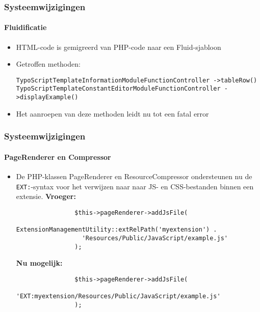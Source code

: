 \begin{frame}[fragile]
	\frametitle{Systeemwijzigingen}
	\framesubtitle{Fluidificatie}

	\begin{itemize}
		\item HTML-code is gemigreerd van PHP-code naar een Fluid-sjabloon
		\item Getroffen methoden:\newline

			\smaller\texttt{TypoScriptTemplateInformationModuleFunctionController\newline
				->tableRow()}\normalsize\newline
			\smaller\texttt{TypoScriptTemplateConstantEditorModuleFunctionController\newline
				->displayExample()}\normalsize

		\item Het aanroepen van deze methoden leidt nu tot een fatal error

	\end{itemize}

\end{frame}


\begin{frame}[fragile]
	\frametitle{Systeemwijzigingen}
	\framesubtitle{PageRenderer en Compressor}

	\lstset{basicstyle=\smaller\ttfamily}

	\begin{itemize}

		\item De PHP-klassen PageRenderer en ResourceCompressor ondersteunen nu de \texttt{EXT:}-syntax 
			voor het verwijzen naar naar JS- en CSS-bestanden binnen een extensie.\newline
			\textbf{Vroeger:}

			\begin{lstlisting}
				$this->pageRenderer->addJsFile(
				  ExtensionManagementUtility::extRelPath('myextension') .
				  'Resources/Public/JavaScript/example.js'
				);
			\end{lstlisting}

			\textbf{Nu mogelijk:}

			\begin{lstlisting}
				$this->pageRenderer->addJsFile(
				  'EXT:myextension/Resources/Public/JavaScript/example.js'
				);
			\end{lstlisting}

	\end{itemize}

\end{frame}

